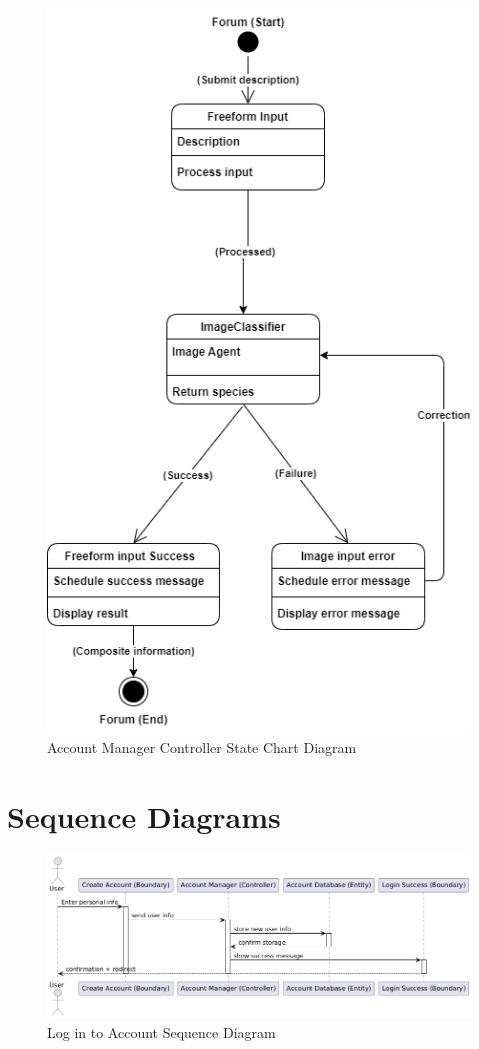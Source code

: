 \documentclass[]{article}
\numberwithin{figure}{section}
\begin{document}
\begin{figure}[h]
    \centering
    \includegraphics[scale=0.8]{Image_Agent.png}
    \caption{Account Manager Controller State Chart Diagram}
    \label{fig:account_manager_controller}
\end{figure}

\clearpage 


\section{Sequence Diagrams}
\label{sec:sequence_diagrams}
\begin{figure}[h]
    \centering
    \includegraphics[scale=0.5]{login_sequence.png}
    \caption{Log in to Account Sequence Diagram}
    \label{fig:login_sequence}
\end{figure}
\clearpage
\end{document}

